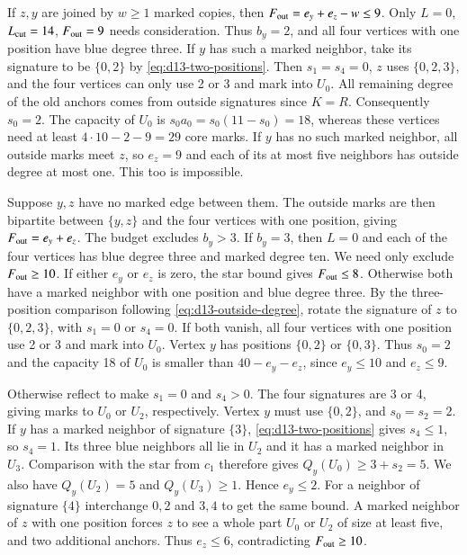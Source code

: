 If $z,y$ are joined by $w\ge1$ marked copies, then
$F_{\rm out}=e_y+e_z-w\le9$. Only $L=0$, $L_{\rm cut}=14$,
$F_{\rm out}=9$ needs consideration. Thus $b_y=2$, and all four
vertices with one position have blue degree three. If $y$ has such a
marked neighbor, take its signature to be $\{0,2\}$ by
\eqref{eq:d13-two-positions}. Then $s_1=s_4=0$, $z$ uses $\{0,2,3\}$,
and the four vertices can only use 2 or 3 and mark into $U_0$.
All remaining degree of the old anchors comes from outside signatures
since $K=R$. Consequently $s_0=2$. The capacity of $U_0$ is
$s_0a_0=s_0(11-s_0)=18$, whereas these vertices need at least
$4\cdot10-2-9=29$ core marks. If $y$ has no such marked neighbor,
all outside marks meet $z$, so $e_z=9$ and each of its at most five
neighbors has outside degree at most one. This too is impossible.

Suppose $y,z$ have no marked edge between them. The outside marks
are then bipartite between $\{y,z\}$ and the four vertices with one
position, giving $F_{\rm out}=e_y+e_z$. The budget excludes $b_y>3$.
If $b_y=3$, then $L=0$ and each of the four vertices has blue degree
three and marked degree ten. We need only exclude $F_{\rm out}\ge10$.
If either $e_y$ or $e_z$ is zero, the star bound gives
$F_{\rm out}\le8$. Otherwise both have a marked neighbor with one
position and blue degree three. By the three-position comparison
following \eqref{eq:d13-outside-degree}, rotate the signature of $z$
to $\{0,2,3\}$, with $s_1=0$ or $s_4=0$. If both vanish, all four
vertices with one position use 2 or 3 and mark into $U_0$.
Vertex $y$ has positions $\{0,2\}$ or $\{0,3\}$. Thus $s_0=2$
and the capacity 18 of $U_0$ is smaller than $40-e_y-e_z$, since
$e_y\le10$ and $e_z\le9$.

Otherwise reflect to make $s_1=0$ and $s_4>0$. The four signatures
are 3 or 4, giving marks to $U_0$ or $U_2$, respectively. Vertex
$y$ must use $\{0,2\}$, and $s_0=s_2=2$. If $y$ has a marked neighbor
of signature $\{3\}$, \eqref{eq:d13-two-positions} gives $s_4\le1$,
so $s_4=1$. Its three blue neighbors all lie in $U_2$ and it has a
marked neighbor in $U_3$. Comparison with the star from $c_1$
therefore gives $Q_y(U_0)\ge3+s_2=5$. We also have $Q_y(U_2)=5$ and
$Q_y(U_3)\ge1$. Hence $e_y\le2$. For a neighbor of signature
$\{4\}$ interchange $0,2$ and $3,4$ to get the same bound.
A marked neighbor of $z$ with one position forces $z$ to see a
whole part $U_0$ or $U_2$ of size at least five, and two additional
anchors. Thus $e_z\le6$, contradicting $F_{\rm out}\ge10$.

